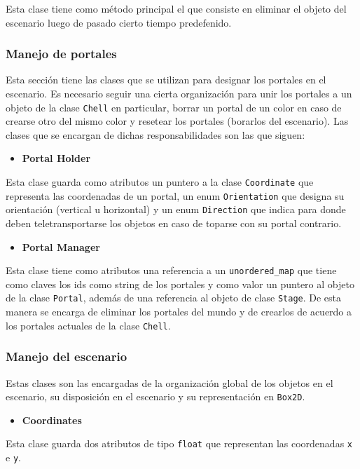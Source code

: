 \documentclass[a4paper]{article}
\begin{document}
Esta clase tiene como método principal el que consiste en eliminar el objeto del escenario luego de pasado cierto tiempo predefenido.

\subsubsection{Manejo de portales}

Esta sección tiene las clases que se utilizan para designar los portales en el escenario. Es necesario seguir una cierta organización para unir los portales a un objeto de la clase \texttt{Chell} en particular, borrar un portal de un color en caso de crearse otro del mismo color y resetear los portales (borarlos del escenario). Las clases que se encargan de dichas responsabilidades son las que siguen:

\begin{itemize}
	\item \textbf{Portal Holder}
\end{itemize}

Esta clase guarda como atributos un puntero a la clase \texttt{Coordinate} que representa las coordenadas de un portal, un enum \texttt{Orientation} que designa su orientación (vertical u horizontal) y un enum \texttt{Direction} que indica para donde deben teletransportarse los objetos en caso de toparse con su portal contrario.

\begin{itemize}
	\item \textbf{Portal Manager}
\end{itemize}

Esta clase tiene como atributos una referencia a un \texttt{unordered\_map} que tiene como claves los ids como string de los portales y como valor un puntero al objeto de la clase \texttt{Portal}, además de una referencia al objeto de clase \texttt{Stage}. De esta manera se encarga de eliminar los portales del mundo y de crearlos de acuerdo a los portales actuales de la clase \texttt{Chell}.

\subsubsection{Manejo del escenario}

Estas clases son las encargadas de la organización global de los objetos en el escenario, su disposición en el escenario y su representación en \texttt{Box2D}.

\begin{itemize}
	\item \textbf{Coordinates}
\end{itemize}
Esta clase guarda dos atributos de tipo \texttt{float} que representan las coordenadas \texttt{x} e \texttt{y}.
\end{document}

